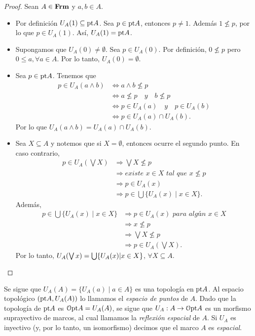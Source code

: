 \documentclass{comunicaciones}
\begin{document}
\begin{proof}
  Sean $A\in \mathbf{Frm}$ y $a,b\in A$.
\begin{itemize}
\item Por definición $U_A(1)\subseteq \mathrm{pt} A$. Sea $p\in \mathrm{pt} A$, entonces $p\neq 1$. Además $1\not\leq p$, por lo que $p\in U_A(1)$. Así, $U_A(1)=\mathrm{pt} A$.
\item Supongamos que $U_A(0)\neq \emptyset$. Sea $p\in U_A(0)$. Por definición, $0\not\leq p$ pero $0\leq a, \forall a\in A$. Por lo tanto, $U_A(0)=\emptyset$.
\item Sea $p\in \mathrm{pt} A$. Tenemos que
\begin{align*}
p\in U_A(a\wedge b)&\iff a\wedge b\not\leq p\\
&\iff a\not\leq p\quad y\quad b\not\leq p\\
&\iff p\in U_A(a)\quad y\quad p\in U_A(b)\\
&\iff p\in U_A(a)\cap U_A(b).
\end{align*}
Por lo que $U_A(a\wedge b)=U_A(a)\cap U_A(b)$.
\item Sea $X\subseteq A$ y notemos que si $X=\emptyset$, entonces ocurre el segundo punto. En caso contrario,
\begin{align*}
p\in U_A(\bigvee X)&\Rightarrow \bigvee X\not\leq p\\
&\Rightarrow \textit{existe }x\in X\textit{ tal que }x\not\leq p\\
&\Rightarrow p\in U_A(x)\\
&\Rightarrow p\in \bigcup \{U_A(x)\mid x\in X\}.
\end{align*}
Además,
\begin{align*}
p\in \bigcup\{U_A(x)\mid x\in X\}&\Rightarrow p\in U_A(x)\textit{ para algún }x\in X\\
&\Rightarrow x\not \leq p\\
&\Rightarrow \bigvee X\not\leq p\\
&\Rightarrow p\in U_A(\bigvee X).
\end{align*}
Por lo tanto, $U_A(\bigvee x)=\bigcup \{U_A(x)|x\in X\}$, $\forall X\subseteq A$.
\end{itemize}
\end{proof}
Se sigue que $U_A(A)=\{U_A(a)\mid a\in A\}$ es una topología en $\mathrm{pt}
A$. Al espacio topológico $(\mathrm{pt} A,U_A(A))$ lo llamamos
el \textit{espacio de puntos} de $A$.
Dado que la topología de $\mathrm{pt} A$ es $\mathcal{O}\mathrm{pt} A=U_A(A)$,
se sigue que $U_A:A\to\mathcal{O}\mathrm{pt} A$ es un morfismo suprayectivo de marcos, al cual llamamos la \textit{reflexión
espacial} de $A$. Si $U_A$ es inyectivo (y, por lo tanto, un
isomorfismo) decimos que el marco $A$ es \textit{espacial}.\\
\end{document}
